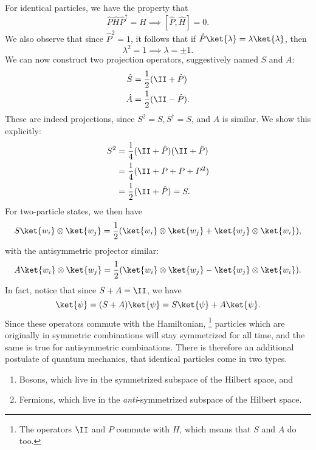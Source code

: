 For identical particles, we have the property that
\begin{equation}
    \hat P \hat H \hat P^\dagger =H \implies [\hat P,\hat H]=0.
\end{equation}
We also observe that since $\hat P^2 = 1$, it follows that if $\hat P \ket{\lambda}= \lambda\ket{\lambda}$, then
\begin{equation}
    \lambda^2 = 1 \implies \lambda = \pm 1.
\end{equation}
We can now construct two projection operators, suggestively named $S$ and $A$:
\begin{align}
    \hat S &= \frac{1}{2}(\II + \hat P)\\
    \hat A &= \frac{1}{2}(\II - \hat P).
\end{align}
These are indeed projections, since $S^2 = S, S^\dagger = S$, and $A$ is similar. We show this explicitly:
\begin{align*}
    S^2 &= \frac{1}{4}(\II + \hat P)(\II + \hat P)\\
        &= \frac{1}{4}(\II + P + P + P^2)\\
        &= \frac{1}{2}(\II+\hat P) = S.
\end{align*}
For two-particle states, we then have
\begin{equation}
    S \ket{w_i} \otimes \ket{w_j} =\frac{1}{2}(\ket{w_i} \otimes \ket{w_j} + \ket{w_j} \otimes \ket{w_i}),
\end{equation}
with the antisymmetric projector similar:
\begin{equation}
    A \ket{w_i} \otimes \ket{w_j} =\frac{1}{2}(\ket{w_i} \otimes \ket{w_j} - \ket{w_j} \otimes \ket{w_i}).
\end{equation}
In fact, notice that since $S+A=\II$, we have
\begin{equation}
    \ket{\psi} = (S+A) \ket{\psi} = S\ket{\psi} + A \ket{\psi}.
\end{equation}
Since these operators commute with the Hamiltonian,%
    \footnote{The operators $\II$ and $P$ commute with $H$, which means that $S$ and $A$ do too.}
particles which are originally in symmetric combinations will stay symmetrized for all time, and the same is true for antisymmetric combinations. There is therefore an additional postulate of quantum mechanics, that identical particles come in two types.
\begin{enumerate}
    \item Bosons, which live in the symmetrized subspace of the Hilbert space, and
    \item Fermions, which live in the \emph{anti}-symmetrized subspace of the Hilbert space.
\end{enumerate}

